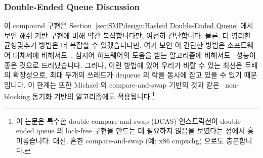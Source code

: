 \subsubsection{Double-Ended Queue Discussion}
\label{sec:SMPdesign:Double-Ended Queue Discussion}

이 compound 구현은
Section~\ref{sec:SMPdesign:Hashed Double-Ended Queue}
에서 보인 해쉬 기반 구현에 비해 약간 복잡합니다만, 여전히 간단합니다.
물론, 더 영리한 균형맞추기 방법은 더 복잡할 수 있겠습니다만, 여기 보인 이
간단한 방법은 소프트웨어 대체제에
비해서도~\cite{LukeDalessandro:2011:ASPLOS:HybridNOrecSTM:deque}, 심지어
하드웨어의 도움을 받는 알고리즘에 비해서도~\cite{DavidDice:2010:SCA:HTM:deque}
성능이 좋은 것으로 드러났습니다.
그러나, 이런 방법에 있어 우리가 바랄 수 있는 최선은 두배의 확장성으로, 최대
두개의 쓰레드가 dequeue 의 락을 동시에 잡고 있을 수 있기 때문입니다.
이 한계는 또한 Michael 의 compare-and-swap 기반의 것과
같은~\cite{DBLP:conf/europar/Michael03} non-blocking 동기화 기반의 알고리즘에도
적용됩니다.\footnote{
	이 논문은 특수한 double-compare-and-swap (DCAS) 인스트럭션이
	double-ended queue 의 lock-free 구현을 만드는 데 필요하지 않음을
	보였다는 점에서 흥미롭습니다.
	대신, 흔한 compare-and-swap (예: x86 cmpxchg) 으로도 충분합니다.}


